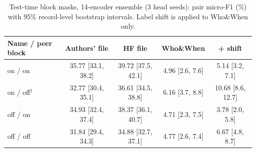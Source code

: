\begin{table}[t]
\caption{Test-time block masks, 14-encoder ensemble (3 head seeds): pair micro-F1 (\%) with 95\% record-level bootstrap intervals. Label shift is applied to Who\&When only.}
\label{tab:gridci}
\centering\footnotesize\setlength{\tabcolsep}{3pt}
\begin{tabular}{@{}lcccc@{}}
\toprule
Name / peer block & Authors' file & HF file & Who\&When & + shift \\
\midrule
on / on & 35.77 {\scriptsize[33.1, 38.2]} & 39.72 {\scriptsize[37.5, 42.1]} & 4.96 {\scriptsize[2.6, 7.6]} & 5.14 {\scriptsize[3.2, 7.1]} \\
on / off$^\dagger$ & 32.77 {\scriptsize[30.4, 35.1]} & 36.61 {\scriptsize[34.5, 38.8]} & 6.16 {\scriptsize[3.7, 8.8]} & 10.68 {\scriptsize[8.6, 12.7]} \\
off / on & 34.93 {\scriptsize[32.4, 37.4]} & 38.37 {\scriptsize[36.1, 40.7]} & 4.71 {\scriptsize[2.3, 7.5]} & 3.78 {\scriptsize[2.0, 5.8]} \\
off / off & 31.84 {\scriptsize[29.4, 34.3]} & 34.88 {\scriptsize[32.7, 37.1]} & 4.77 {\scriptsize[2.6, 7.4]} & 6.67 {\scriptsize[4.8, 8.7]} \\
\bottomrule
\end{tabular}
\end{table}
